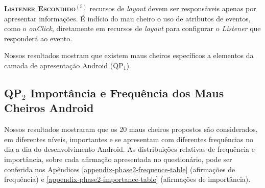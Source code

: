   \noindent
  \textbf{\textsc{{\small Listener Escondido}}}$^{(5)}$
      recursos de \textit{layout} devem ser responsáveis apenas por apresentar informações. É indício do mau cheiro o uso de atributos de eventos, como o \textit{onClick}, diretamente em recursos de \textit{layout} para configurar o \textit{Listener} que responderá ao evento. \\



\begin{square}
  \small
  Nossos resultados mostram que existem maus cheiros específicos a elementos da camada de apresentação Android (QP$_1$).
\end{square}












\subsection{QP$_2$ Importância e Frequência dos Maus Cheiros Android}
\label{phase2-results}


Nossos resultados mostraram que os 20 maus cheiros propostos são considerados, em diferentes níveis, importantes e se apresentam com diferentes frequências no dia a dia do desenvolvimento Android. As distribuições relativas de frequência e importância, sobre cada afirmação apresentada no questionário, pode ser conferida nos Apêndices \ref{appendix-phase2-frequence-table} (afirmações de frequência) e \ref{appendix-phase2-importance-table} (afirmações de importância).

